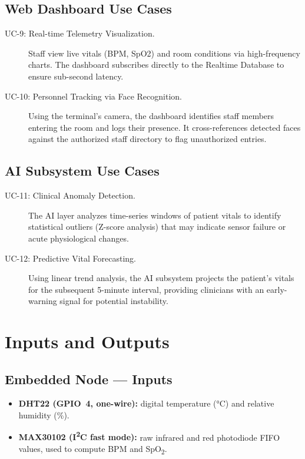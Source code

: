 \subsection*{Web Dashboard Use Cases}

\begin{description}
	\item[UC-9: Real-time Telemetry Visualization.]
	      Staff view live vitals (BPM, SpO2) and room conditions via high-frequency charts. The dashboard subscribes directly to the Realtime Database to ensure sub-second latency.
	      
	\item[UC-10: Personnel Tracking via Face Recognition.]
	      Using the terminal's camera, the dashboard identifies staff members entering the room and logs their presence. It cross-references detected faces against the authorized staff directory to flag unauthorized entries.
\end{description}

\subsection*{AI Subsystem Use Cases}

\begin{description}
	\item[UC-11: Clinical Anomaly Detection.]
	      The AI layer analyzes time-series windows of patient vitals to identify statistical outliers (Z-score analysis) that may indicate sensor failure or acute physiological changes.
	      
	\item[UC-12: Predictive Vital Forecasting.]
	      Using linear trend analysis, the AI subsystem projects the patient's vitals for the subsequent 5-minute interval, providing clinicians with an early-warning signal for potential instability.
\end{description}

\section{Inputs and Outputs}

\subsection*{Embedded Node — Inputs}

\begin{itemize}
	\item \textbf{DHT22 (GPIO~4, one-wire):} digital temperature (°C) and relative
	      humidity (\%).
	\item \textbf{MAX30102 (I\textsuperscript{2}C fast mode):} raw infrared
	      and red photodiode FIFO values, used to compute BPM and SpO\textsubscript{2}.
\end{itemize}

